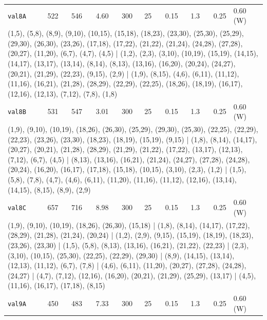 \begin{longtable}{lrrrrrrrrl}
\texttt{val8A} & 522 & 546 & 4.60 & 300 & 25 & 0.15 & 1.3 & 0.25 & 0.60\,(W) \\
\multicolumn{10}{p{0.96\linewidth}}{\tiny\raggedright\arraybackslash (1,5), (5,8), (8,9), (9,10), (10,15), (15,18), (18,23), (23,30), (25,30), (25,29), (29,30), (26,30), (23,26), (17,18), (17,22), (21,22), (21,24), (24,28), (27,28), (20,27), (11,20), (6,7), (4,7), (4,5) | (1,2), (2,3), (3,10), (10,19), (15,19), (14,15), (14,17), (13,17), (13,14), (8,14), (8,13), (13,16), (16,20), (20,24), (24,27), (20,21), (21,29), (22,23), (9,15), (2,9) | (1,9), (8,15), (4,6), (6,11), (11,12), (11,16), (16,21), (21,28), (28,29), (22,29), (22,25), (18,26), (18,19), (16,17), (12,16), (12,13), (7,12), (7,8), (1,8)} \\[2pt]
\texttt{val8B} & 531 & 547 & 3.01 & 300 & 25 & 0.15 & 1.3 & 0.25 & 0.60\,(W) \\
\multicolumn{10}{p{0.96\linewidth}}{\tiny\raggedright\arraybackslash (1,9), (9,10), (10,19), (18,26), (26,30), (25,29), (29,30), (25,30), (22,25), (22,29), (22,23), (23,26), (23,30), (18,23), (18,19), (15,19), (9,15) | (1,8), (8,14), (14,17), (20,27), (20,21), (21,28), (28,29), (21,29), (21,22), (17,22), (13,17), (12,13), (7,12), (6,7), (4,5) | (8,13), (13,16), (16,21), (21,24), (24,27), (27,28), (24,28), (20,24), (16,20), (16,17), (17,18), (15,18), (10,15), (3,10), (2,3), (1,2) | (1,5), (5,8), (7,8), (4,7), (4,6), (6,11), (11,20), (11,16), (11,12), (12,16), (13,14), (14,15), (8,15), (8,9), (2,9)} \\[2pt]
\texttt{val8C} & 657 & 716 & 8.98 & 300 & 25 & 0.15 & 1.3 & 0.25 & 0.60\,(W) \\
\multicolumn{10}{p{0.96\linewidth}}{\tiny\raggedright\arraybackslash (1,9), (9,10), (10,19), (18,26), (26,30), (15,18) | (1,8), (8,14), (14,17), (17,22), (28,29), (21,28), (21,24), (20,24) | (1,2), (2,9), (9,15), (15,19), (18,19), (18,23), (23,26), (23,30) | (1,5), (5,8), (8,13), (13,16), (16,21), (21,22), (22,23) | (2,3), (3,10), (10,15), (25,30), (22,25), (22,29), (29,30) | (8,9), (14,15), (13,14), (12,13), (11,12), (6,7), (7,8) | (4,6), (6,11), (11,20), (20,27), (27,28), (24,28), (24,27) | (4,7), (7,12), (12,16), (16,20), (20,21), (21,29), (25,29), (13,17) | (4,5), (11,16), (16,17), (17,18), (8,15)} \\[2pt]
\texttt{val9A} & 450 & 483 & 7.33 & 300 & 25 & 0.15 & 1.3 & 0.25 & 0.60\,(W) \\

\end{longtable}
